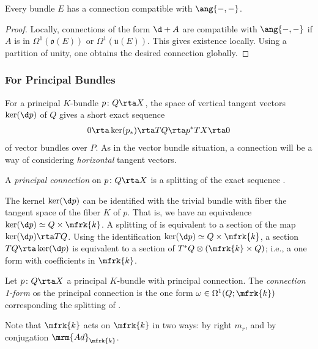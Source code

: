 \begin{lem}
	Every bundle $E$ has a connection compatible with $\ang{-,-}$.
\end{lem}

\begin{proof}
	Locally, connections of the form $ \d+A$ are compatible with $\ang{-,-}$ if $A$ is in $\Omega^1(\mathfrak{o}(E))$ or $\Omega^1(\mathfrak{u}(E))$. 
	This gives existence locally. Using a partition of unity, one obtains the desired connection globally.
	\end{proof}

\subsubsection{For Principal Bundles}\label{subsec-principal}
For a principal $K$-bundle $p\colon Q\rta X$, 
the space of vertical tangent vectors $\ker(\d p)$ of $Q$ gives a short exact sequence
\begin{align}\label{ses principal}
0\rta\ker(p_*)\rta TQ\rta p^*TX\rta 0
\end{align}
of vector bundles over $P$. 
As in the vector bundle situation, a connection will be a way of considering \emph{horizontal} tangent vectors.

\begin{defn}
A \emph{principal connection} on $p\colon Q\rta X$ is a splitting of the exact sequence . 
\end{defn}

The kernel $\ker(\d p)$ can be identified with the trivial bundle with fiber the tangent space of the fiber $K$ of $p$. 
That is, we have an equivalence $\ker(\d p)\simeq Q\times \mfrk{k}$. 
A splitting of  is equivalent to a section of the map $\ker (\d p)\rta TQ$. 
Using the identification $\ker(\d p)\simeq Q\times \mfrk{k}$, 
a section $TQ\rta \ker(\d p)$ is equivalent to a section of $T^*Q\otimes( \mfrk{k}\times Q)$; i.e., a one form with coefficients in $\mfrk{k}$. 

\begin{defn}
Let $p\colon Q\rta X$ a principal $K$-bundle with principal connection. 
The \emph{connection 1-form} os the principal connection is the one form 
$\omega\in \Omega^1(Q;\mfrk{k})$ 
corresponding the splitting of .
\end{defn}

Note that $\mfrk{k}$ acts on $\mfrk{k}$ in two ways: 
by right $m_r$, 
and by conjugation $\mrm{Ad}_\mfrk{k}$. 

